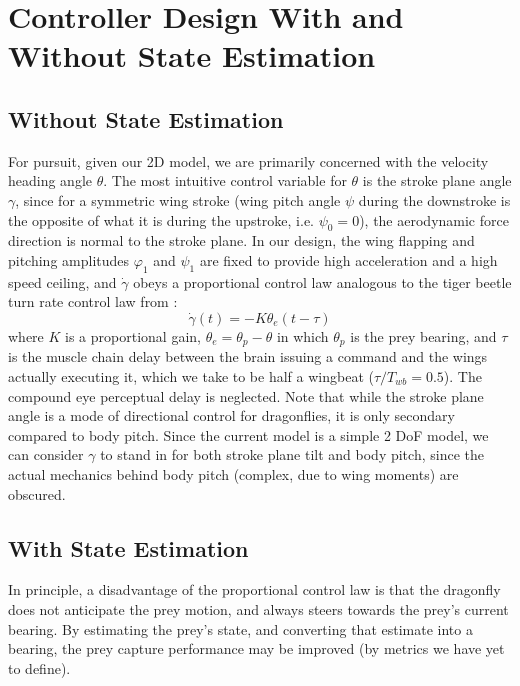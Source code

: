 \documentclass[12pt]{article}
\begin{document}
\section{Controller Design With and Without State Estimation}

\subsection{Without State Estimation}

For pursuit, given our 2D model, we are primarily concerned with
the velocity heading angle $\theta$. The most intuitive control
variable for $\theta$ is the stroke plane angle $\gamma$, since for
a symmetric wing stroke (wing pitch angle $\psi$
during the downstroke is the opposite of what it is
during the upstroke, i.e. $\psi_0 = 0$), the aerodynamic
force direction is normal to the stroke plane. In our design, the
wing flapping and pitching amplitudes $\varphi_1$ and $\psi_1$
are fixed to provide high acceleration and a high speed ceiling,
and $\dot\gamma$ obeys a proportional control law analogous to the
tiger beetle turn rate control law from \cite{haselsteiner2014}:
\begin{equation}
    \dot\gamma(t) = -K \theta_e(t - \tau)
\end{equation}
where $K$ is a proportional gain, $\theta_e = \theta_p - \theta$
in which $\theta_p$ is the prey bearing, and $\tau$ is the
muscle chain delay between the brain issuing a command and the wings
actually executing it, which we take to be half a wingbeat
($\tau/T_{wb} = 0.5$). The compound eye perceptual delay is neglected.
Note that while the stroke plane angle is a mode of directional
control for dragonflies, it is only secondary compared to
body pitch. Since the current model is a simple 2 DoF model,
we can consider $\gamma$ to stand in for both stroke plane tilt
and body pitch, since the actual mechanics behind body pitch
(complex, due to wing moments) are obscured.

\subsection{With State Estimation}

In principle, a disadvantage of the proportional control law
is that the dragonfly does not anticipate the prey motion,
and always steers towards the prey's current bearing.
By estimating the prey's state, and converting that estimate
into a bearing, the prey capture performance may be improved
(by metrics we have yet to define).
\end{document}
